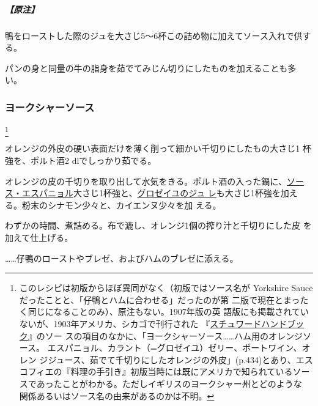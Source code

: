 \begin{recette}
\hypertarget{nota-sage-and-onions-sauce}{%
\subparagraph{【原注】}\label{nota-sage-and-onions-sauce}}

鴨をローストした際のジュを大さじ5〜6杯この詰め物に加えてソース入れで供する。

パンの身と同量の牛の脂身を茹でてみじん切りにしたものを加えることも多い。

\maeaki

\hypertarget{sauce-yorkshire}{%
\subsubsection{ヨークシャーソース}\label{sauce-yorkshire}}

\footnote{このレシピは初版からほぼ異同がなく（初版ではソース名が
  Yorkshire Sauceだったことと、「仔鴨とハムに合わせる」だったのが第
  二版で現在とまったく同じになることのみ）、原注もない。1907年版の英
  語版にも掲載されていないが、1903年アメリカ、シカゴで刊行された
  『\href{https://archive.org/details/stewardshandbook00whitiala}{スチュワードハンドブッ
  ク}』のソー
  スの項目のなかに、「ヨークシャーソース\ldots{}\ldots{}ハム用のオレンジソース。
  エスパニョル、カラント（=グロゼイユ）ゼリー、ポートワイン、オレン
  ジジュース、茹でて千切りにしたオレンジの外皮」(p.434)とあり、エス
  コフィエの『料理の手引き』初版当時には既にアメリカで知られているソー
  スであったことがわかる。ただしイギリスのヨークシャー州とどのような
  関係あるいはソース名の由来があるのかは不明。}


オレンジの外皮の硬い表面だけを薄く削って細かい千切りにしたもの大さじ1
杯強を、ポルト酒2 dlでしっかり茹でる。

オレンジの皮の千切りを取り出して水気をきる。ポルト酒の入った鍋に、\protect\hyperlink{sauce-espagnole}{ソー
ス・エスパニョル}大さじ1杯強と、\protect\hyperlink{}{グロゼイユのジュ
レ}も大さじ1杯強を加える。粉末のシナモン少々と、カイエンヌ少々を加
える。

わずかの時間、煮詰める。布で漉し、オレンジ1個の搾り汁と千切りにした皮
を加えて仕上げる。

\ldots{}\ldots{}仔鴨のローストやブレゼ、およびハムのブレゼに添える。
\end{recette}
